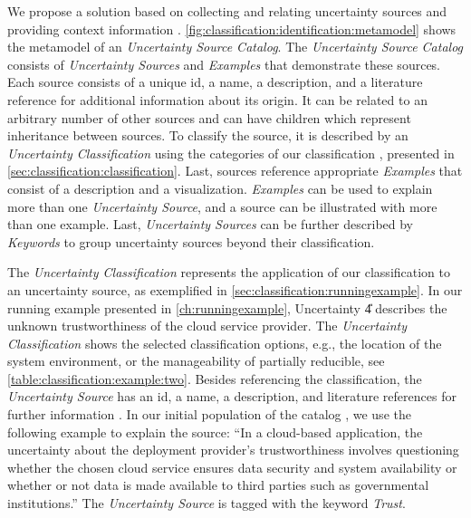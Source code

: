 We propose a solution based on collecting and relating uncertainty sources and providing context information \cite{hahner_arcn_2024}.
\autoref{fig:classification:identification:metamodel} shows the metamodel of an \emph{Uncertainty Source Catalog}.
The \emph{Uncertainty Source Catalog} consists of \emph{Uncertainty Sources} and \emph{Examples} that demonstrate these sources.
Each source consists of a unique id, a name, a description, and a literature reference for additional information about its origin.
It can be related to an arbitrary number of other sources and can have children which represent inheritance between sources.
To classify the source, it is described by an \emph{Uncertainty Classification} using the categories of our classification \cite{hahner_classification_2023}, presented in \autoref{sec:classification:classification}.
Last, sources reference appropriate \emph{Examples} that consist of a description and a visualization.
\emph{Examples} can be used to explain more than one \emph{Uncertainty Source}, and a source can be illustrated with more than one example.
Last, \emph{Uncertainty Sources} can be further described by \emph{Keywords} to group uncertainty sources beyond their classification.

The \emph{Uncertainty Classification} represents the application of our classification to an uncertainty source, as exemplified in \autoref{sec:classification:runningexample}.
In our running example presented in \autoref{ch:runningexample}, Uncertainty \U{4} describes the unknown trustworthiness of the cloud service provider.
The \emph{Uncertainty Classification} shows the selected classification options, e.g., the location of the system environment, or the manageability of partially reducible, see \autoref{table:classification:example:two}.
Besides referencing the classification, the \emph{Uncertainty Source} has an id, a name, a description, and literature references for further information \cite{hahner_classification_2023,ramirez_taxonomy_2012}.
In our initial population of the catalog \cite{dataset}, we use the following example to explain the source: \enquote{In a cloud-based application, the uncertainty about the deployment provider's trustworthiness involves questioning whether the chosen cloud service ensures data security and system availability or whether or not data is made available to third parties such as governmental institutions.}
The \emph{Uncertainty Source} is tagged with the keyword \emph{Trust}.

